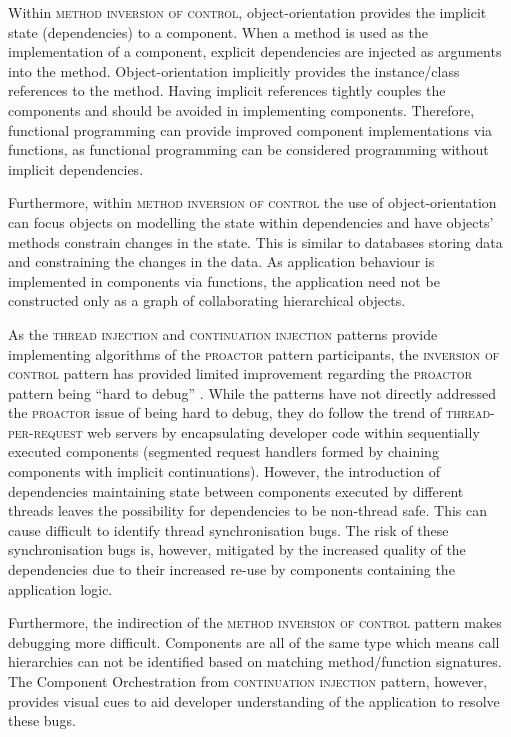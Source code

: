 \documentclass[prodmode]{style/acmlarge}
\begin{document}
Within \textsc{method inversion of control}, object-orientation provides the
implicit state (dependencies) to a component.  When a method is used as the
implementation of a component, explicit dependencies are injected as arguments
into the method.  Object-orientation implicitly provides the instance/class
references to the method.  Having implicit references tightly couples the
components and should be avoided in implementing components.  Therefore,
functional programming can provide improved component implementations via
functions, as functional programming can be considered programming without
implicit dependencies.

Furthermore, within \textsc{method inversion of control} the use of
object-orientation can focus objects on modelling the state within dependencies
and have objects' methods constrain changes in the state.  This is similar to
databases storing data and constraining the changes in the data.  As application
behaviour is implemented in components via functions, the application need not
be constructed only as a graph of collaborating hierarchical objects.

As the \textsc{thread injection} and \textsc{continuation injection} patterns
provide implementing algorithms of the \textsc{proactor} pattern participants,
the \textsc{inversion of control} pattern has provided limited improvement
regarding the \textsc{proactor} pattern being ``hard to debug'' \cite[p.
7]{proactor}.  While the patterns have not directly addressed the
\textsc{proactor} issue of being hard to debug, they do follow the trend of
\textsc{thread-per-request} web servers \cite{thread-per-request} by
encapsulating developer code within sequentially executed components (segmented
request handlers formed by chaining components with implicit continuations).
However, the introduction of dependencies maintaining state between components
executed by different threads leaves the possibility for dependencies to be
non-thread safe.  This can cause difficult to identify thread synchronisation
bugs.  The risk of these synchronisation bugs is, however, mitigated by the
increased quality of the dependencies due to their increased re-use by
components containing the application logic.

Furthermore, the indirection of the \textsc{method inversion of control} pattern
makes debugging more difficult.  Components are all of the same type which means
call hierarchies can not be identified based on matching method/function
signatures.  The Component Orchestration from \textsc{continuation injection}
pattern, however, provides visual cues to aid developer understanding of the
application to resolve these bugs.
\end{document}
